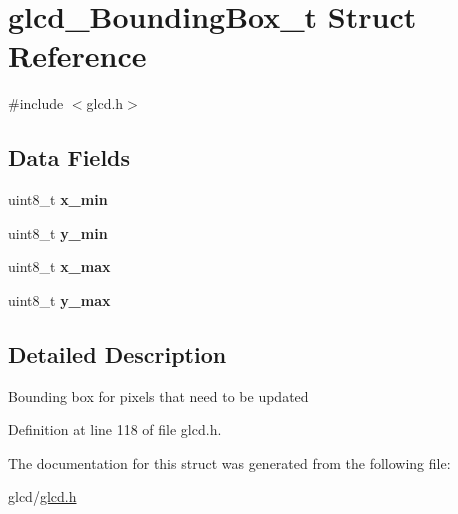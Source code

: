 \hypertarget{structglcd___bounding_box__t}{}\section{glcd\+\_\+\+Bounding\+Box\+\_\+t Struct Reference}
\label{structglcd___bounding_box__t}


{\ttfamily \#include $<$glcd.\+h$>$}

\subsection*{Data Fields}
\begin{DoxyCompactItemize}
\item 
\hypertarget{structglcd___bounding_box__t_a8fefba51043595e8bc44e85a40cf7dd7}{}uint8\+\_\+t {\bfseries x\+\_\+min}\label{structglcd___bounding_box__t_a8fefba51043595e8bc44e85a40cf7dd7}

\item 
\hypertarget{structglcd___bounding_box__t_a1c5f816c1f598c40798981d4ed840c0e}{}uint8\+\_\+t {\bfseries y\+\_\+min}\label{structglcd___bounding_box__t_a1c5f816c1f598c40798981d4ed840c0e}

\item 
\hypertarget{structglcd___bounding_box__t_a582b020f436229530c81d9fea5b9290d}{}uint8\+\_\+t {\bfseries x\+\_\+max}\label{structglcd___bounding_box__t_a582b020f436229530c81d9fea5b9290d}

\item 
\hypertarget{structglcd___bounding_box__t_abe5b42332124ee5d70ee83fea72acba5}{}uint8\+\_\+t {\bfseries y\+\_\+max}\label{structglcd___bounding_box__t_abe5b42332124ee5d70ee83fea72acba5}

\end{DoxyCompactItemize}


\subsection{Detailed Description}
Bounding box for pixels that need to be updated 

Definition at line 118 of file glcd.\+h.



The documentation for this struct was generated from the following file\+:\begin{DoxyCompactItemize}
\item 
glcd/\hyperlink{glcd_8h}{glcd.\+h}\end{DoxyCompactItemize}
